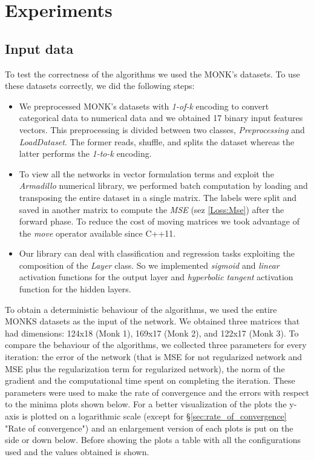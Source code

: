 \section{Experiments}

\subsection{Input data}
To test the correctness of the algorithms we used the MONK's datasets. To use these datasets correctly, we did the following steps:
\begin{itemize}
	\item We preprocessed MONK's datasets with \textit{1-of-k} encoding to convert categorical data to numerical data and we obtained 17 binary input features vectors. This preprocessing is divided between two classes, \textit{Preprocessing} and \textit{LoadDataset}. The former reads, shuffle, and splits the dataset whereas the latter performs the \textit{1-to-k} encoding. 
	\item To view all the networks in vector formulation terms and exploit the \textit{Armadillo} numerical library, we performed batch computation by loading and transposing the entire dataset in a single matrix. The labels were split and saved in another matrix to compute the \textit{MSE} (sez \ref{Loss:Mse}) after the forward phase. To reduce the cost of moving matrices we took advantage of the \textit{move} operator available since C++11. 
	\item Our library can deal with classification and regression tasks exploiting the composition of the \textit{Layer} class.  So we implemented \textit{sigmoid} and \textit{linear} activation functions for the output layer and \textit{hyperbolic tangent} activation function for the hidden layers.
\end{itemize}



To obtain a deterministic behaviour of the algorithms, we used the entire MONKS datasets as the input of the network. We obtained three matrices that had dimensions: 124x18 (Monk 1), 169x17 (Monk 2), and 122x17 (Monk 3). To compare the behaviour of the algorithms, we collected three parameters for every iteration: the error of the network (that is MSE for not regularized network and MSE plus the regularization term for regularized network), the norm of the gradient and the computational time spent on completing the iteration. These parameters were used to make the rate of convergence and the errors with respect to the minima plots shown below. For a better visualization of the plots the y-axis is plotted on a logarithmic scale (except for \S \ref{sec:rate_of_convergence} "Rate of convergence") and an enlargement version of each plots is put on the side or down below. Before showing the plots a table with all the configurations used and the values obtained is shown.

